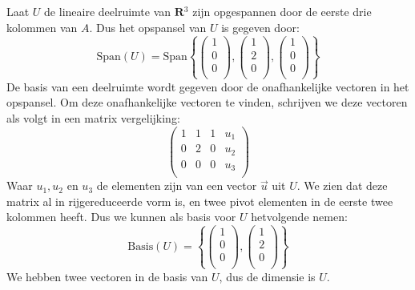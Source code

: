 \documentclass[12pt, a4paper]{article}
\begin{document}
\begin{enumerate}[(a.)]
Laat $U$ de lineaire deelruimte van $\mathbf{R}$$^3$ zijn opgespannen door de eerste drie kolommen van $A$. Dus het opspansel van $U$ is gegeven door:
\begin{equation} 
    \text{Span}(U) = 
    \text{Span}\left\{
        \begin{pmatrix}
            1 \\
            0 \\
            0 \\
        \end{pmatrix}
        ,
        \begin{pmatrix}
            1 \\
            2 \\
            0 \\
        \end{pmatrix}
        ,
        \begin{pmatrix}
            1 \\
            0 \\
            0 \\
        \end{pmatrix}
    \right\}
\end{equation}
De basis van een deelruimte wordt gegeven door de onafhankelijke vectoren in het opspansel. 
Om deze onafhankelijke vectoren te vinden, 
schrijven we deze vectoren als volgt in een matrix vergelijking:
\begin{equation}
    \left(\begin{array}{ccc|c}
        1 & 1 & 1 & u_1\\
        0 & 2 & 0 & u_2\\
        0 & 0 & 0 & u_3\\
    \end{array}\right)
\end{equation}
Waar $u_1,u_2$ en $u_3$ de elementen zijn van een vector $\vec{u}$ uit $U$.
We zien dat deze matrix al in rijgereduceerde vorm is, 
en twee pivot elementen in de eerste twee kolommen heeft.
Dus we kunnen als basis voor $U$ hetvolgende nemen:
\begin{equation}
    \text{Basis}(U) = \left\{
        \begin{pmatrix}
            1 \\
            0 \\
            0 \\
        \end{pmatrix}
        ,
        \begin{pmatrix}
            1 \\
            2 \\
            0 \\
        \end{pmatrix}
    \right\}
\end{equation}
We hebben twee vectoren in de basis van $U$, dus de dimensie is $U$.


\end{enumerate}
\end{document}

